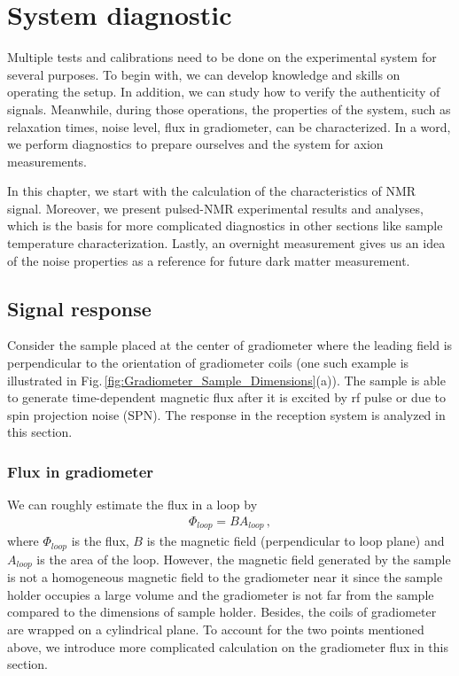 










\chapter{System diagnostic}

Multiple tests and calibrations need to be done on the experimental system for several purposes. To begin with, we can develop knowledge and skills on operating the setup. In addition, we can study how to verify the authenticity of signals. Meanwhile, during those operations, the properties of the system, such as relaxation times, noise level, flux in gradiometer, can be characterized. In a word, we perform diagnostics to prepare ourselves and the system for axion measurements. 

In this chapter, we start with the calculation of the characteristics of NMR signal. Moreover, we present pulsed-NMR experimental results and analyses, which is the basis for more complicated diagnostics in other sections like sample temperature characterization. Lastly, an overnight measurement gives us an idea of the noise properties as a reference for future dark matter measurement. 

\section{Signal response}\label{sec:Signal_response}

Consider the sample placed at the center of gradiometer where the leading field is perpendicular to the orientation of gradiometer coils (one such example is illustrated in Fig.\,\ref{fig:Gradiometer_Sample_Dimensions}(a)). 
The sample is able to generate time-dependent magnetic flux after it is excited by rf pulse or due to spin projection noise (SPN). The response in the reception system is analyzed in this section. 

\subsection{Flux in gradiometer}

We can roughly estimate the flux in a loop by 
\begin{align}
    \Phi_{loop} = B A_{loop}\,,
\end{align}
where $\Phi_{loop}$ is the flux, $B$ is the magnetic field (perpendicular to loop plane) and $A_{loop}$ is the area of the loop. However, the magnetic field generated by the sample is not a homogeneous magnetic field to the gradiometer near it since the sample holder occupies a large volume and the gradiometer is not far from the sample compared to the dimensions of sample holder. Besides, the coils of gradiometer are wrapped on a cylindrical plane. To account for the two points mentioned above, we introduce more complicated calculation on the gradiometer flux in this section. 

